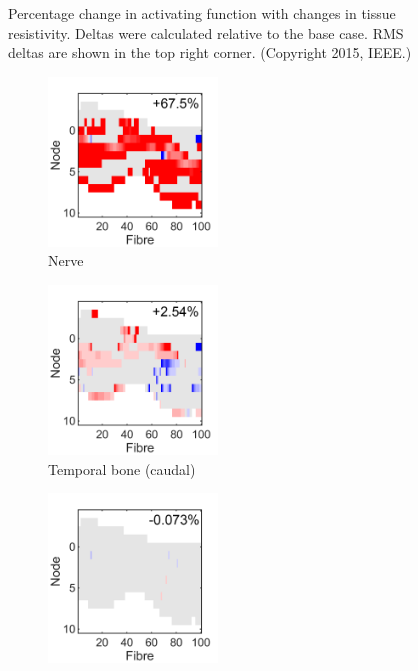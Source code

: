 \begin{figure}
    \caption[Percentage change in activating function with changes in tissue
    resistivity]{Percentage change in activating function with changes in tissue
    resistivity. Deltas were calculated relative to the base case. RMS deltas
    are shown in the top right corner. (Copyright \textcopyright{} 2015, IEEE.)}
	\label{fig:valid_delta_af_TR}
\end{figure}

\begin{figure}
	\centering
	
	\begin{subfigure}[t]{0.3\textwidth}
        \centering
        \includegraphics[height=4.5cm]{Validation/delta_af-BC-nerve}
        \caption{Nerve}
        \label{fig:valid_delta_af_nervetrunk}
    \end{subfigure}%
	\begin{subfigure}[t]{0.3\textwidth}
        \centering
        \includegraphics[height=4.5cm]{Validation/delta_af-BC-caud}
        \caption{Temporal bone (caudal)}
        \label{fig:valid_delta_af_caud}
    \end{subfigure}
	\begin{subfigure}[t]{0.3\textwidth}
        \centering
        \includegraphics[height=4.5cm]{Validation/delta_af-BC-hemi_off}

\end{subfigure}
\end{figure}
